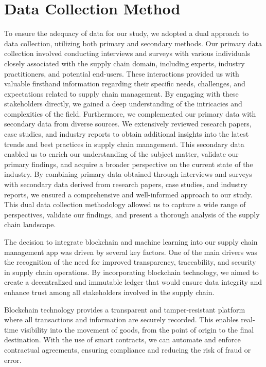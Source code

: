 \section{Data Collection Method}
\noindent To ensure the adequacy of data for our study, we adopted a dual approach to data collection, utilizing both primary and secondary methods. Our primary data collection involved conducting interviews and surveys with various individuals closely associated with the supply chain domain, including experts, industry practitioners, and potential end-users. These interactions provided us with valuable firsthand information regarding their specific needs, challenges, and expectations related to supply chain management. By engaging with these stakeholders directly, we gained a deep understanding of the intricacies and complexities of the field.
Furthermore, we complemented our primary data with secondary data from diverse sources. We extensively reviewed research papers, case studies, and industry reports to obtain additional insights into the latest trends and best practices in supply chain management. This secondary data enabled us to enrich our understanding of the subject matter, validate our primary findings, and acquire a broader perspective on the current state of the industry.
By combining primary data obtained through interviews and surveys with secondary data derived from research papers, case studies, and industry reports, we ensured a comprehensive and well-informed approach to our study. This dual data collection methodology allowed us to capture a wide range of perspectives, validate our findings, and present a thorough analysis of the supply chain landscape.

\noindent The decision to integrate blockchain and machine learning into our supply chain management app was driven by several key factors. One of the main drivers was the recognition of the need for improved transparency, traceability, and security in supply chain operations. By incorporating blockchain technology, we aimed to create a decentralized and immutable ledger that would ensure data integrity and enhance trust among all stakeholders involved in the supply chain.
\par Blockchain technology provides a transparent and tamper-resistant platform where all transactions and information are securely recorded. This enables real-time visibility into the movement of goods, from the point of origin to the final destination. With the use of smart contracts, we can automate and enforce contractual agreements, ensuring compliance and reducing the risk of fraud or error.    
